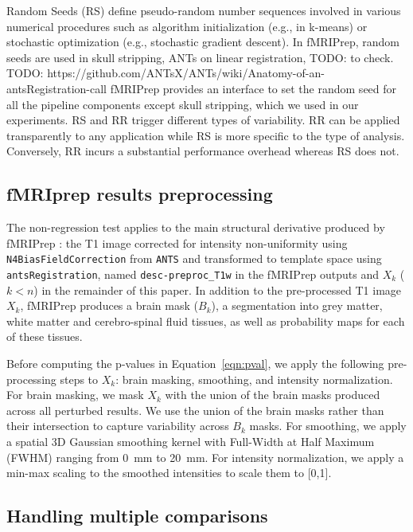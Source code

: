 \documentclass{article}
\newcommand{\TODO}[1]{\color{red}\textsc{TODO:} #1\color{black}\xspace}
\newcommand{\fmriprep}{fMRIPrep \xspace}
\newcommand{\fwhm}{\textsc{FWHM}}
\begin{document}
Random Seeds (RS) define pseudo-random number sequences involved in various
numerical procedures such as algorithm initialization (e.g., in k-means) or
stochastic optimization (e.g., stochastic gradient descent). In fMRIPrep, random
seeds are used in skull stripping, ANTs on linear registration, \TODO{to check}.
\TODO{https://github.com/ANTsX/ANTs/wiki/Anatomy-of-an-antsRegistration-call}
fMRIPrep provides an interface to set the random seed for all the pipeline
components except skull stripping, which we used in our experiments. RS and RR
trigger different types of variability. RR can be applied transparently to any
application while RS is more specific to the type of analysis. Conversely, RR
incurs a substantial performance overhead whereas RS does not.

\subsection{fMRIprep results preprocessing}

The non-regression test applies to the main structural derivative produced by
\fmriprep: the T1 image corrected for intensity non-uniformity using
\texttt{N4BiasFieldCorrection} from \texttt{ANTS} and transformed to template
space using
\texttt{antsRegistration}, named \texttt{desc-preproc\_T1w} in the \fmriprep
outputs and $X_k$ ($k < n$) in the remainder of this paper. In addition to the
pre-processed T1 image $X_k$, \fmriprep produces a brain mask ($B_k$), a
segmentation into grey matter, white matter and cerebro-spinal fluid tissues, as
well as probability maps for each of these tissues.

Before computing the p-values in Equation~\ref{eqn:pval}, we apply the following
pre-processing steps to $X_k$: brain masking, smoothing, and intensity
normalization. For brain masking, we mask $X_k$ with the union of the brain
masks produced across all perturbed results. We use the union of the brain masks
rather than their intersection to capture variability across $B_k$ masks. For
smoothing, we apply a spatial 3D Gaussian smoothing kernel with Full-Width at Half
Maximum (\fwhm) ranging from 0~mm to 20~mm. For intensity normalization, we apply
a min-max scaling to the smoothed intensities to scale them to [0,1].

\subsection{Handling multiple comparisons}
\end{document}
